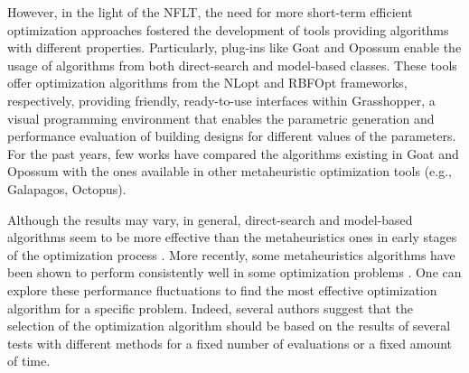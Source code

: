 \begin{table}[]
		\label{table:compare-dfo-algos}	
	\end{table}
	
	
	However, in the light of the \ac{NFLT}, the need for more short-term efficient optimization approaches fostered the development of tools providing algorithms with different properties. Particularly, plug-ins like Goat and Opossum enable the usage of algorithms from both direct-search and model-based classes. These tools offer optimization algorithms from the NLopt and RBFOpt frameworks, respectively, providing friendly, ready-to-use interfaces within Grasshopper, a visual programming environment that enables the parametric generation and performance evaluation of building designs for different values of the parameters. For the past years, few works have compared the algorithms existing in Goat and Opossum with the ones available in other metaheuristic optimization tools (e.g., Galapagos, Octopus).
	
	Although the results may vary, in general, direct-search and model-based algorithms seem to be more effective than the metaheuristics ones in early stages of the optimization process \cite{Wortmann2017,Wortmann2017GABESTCHOICE}. More recently, some metaheuristics algorithms have been shown to perform consistently well in some optimization problems \cite{Waibel2018}. One can explore these performance fluctuations to find the most effective optimization algorithm for a specific problem. Indeed, several authors suggest that the selection of the optimization algorithm should be based on the results of several tests with different methods for a fixed number of evaluations or a fixed amount of time\cite{Hamdy2016, Wortmann2016BBO}. 
		

